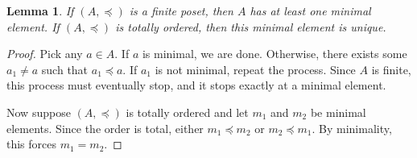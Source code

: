 \documentclass{article}
\newtheorem*{lemma}{Lemma}
\begin{document}
\begin{lemma}
If $(A, \preceq)$ is a finite poset, then $A$ has at least one minimal element. If $(A, \preceq)$ is totally ordered, then this minimal element is unique.
\end{lemma}

\begin{proof}
Pick any $a \in A$. If $a$ is minimal, we are done. Otherwise, there exists some $a_1 \ne a$ such that $a_1 \preceq a$. If $a_1$ is not minimal, repeat the process. Since $A$ is finite, this process must eventually stop, and it stops exactly at a minimal element.

Now suppose $(A, \preceq)$ is totally ordered and let $m_1$ and $m_2$ be minimal elements. Since the order is total, either $m_1 \preceq m_2$ or $m_2 \preceq m_1$. By minimality, this forces $m_1 = m_2$.
\end{proof}
\end{document}
